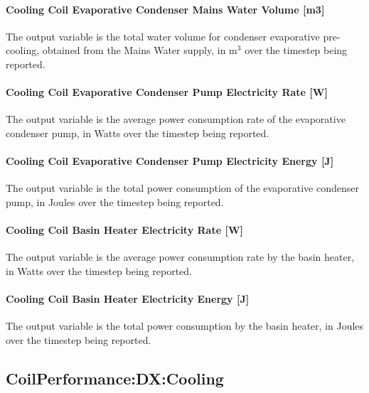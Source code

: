 \paragraph{Cooling Coil Evaporative Condenser Mains Water Volume {[}m3{]}}\label{cooling-coil-evaporative-condenser-mains-water-volume-m3}

The output variable is the total water volume for condenser evaporative pre-cooling, obtained from the Mains Water supply, in m\(^{3}\) over the timestep being reported.

\paragraph{Cooling Coil Evaporative Condenser Pump Electricity Rate {[}W{]}}\label{cooling-coil-evaporative-condenser-pump-electric-powerw}

The output variable is the average power consumption rate of the evaporative condenser pump, in Watts over the timestep being reported.

\paragraph{Cooling Coil Evaporative Condenser Pump Electricity Energy {[}J{]}}\label{cooling-coil-evaporative-condenser-pump-electric-energy-j-1}

The output variable is the total power consumption of the evaporative condenser pump, in Joules over the timestep being reported.

\paragraph{Cooling Coil Basin Heater Electricity Rate {[}W{]}}\label{cooling-coil-basin-heater-electric-power-w-1}

The output variable is the average power consumption rate by the basin heater, in Watts over the timestep being reported.

\paragraph{Cooling Coil Basin Heater Electricity Energy {[}J{]}}\label{cooling-coil-basin-heater-electric-energy-j-1}

The output variable is the total power consumption by the basin heater, in Joules over the timestep being reported.

\subsection{CoilPerformance:DX:Cooling}\label{coilperformancedxcooling}

